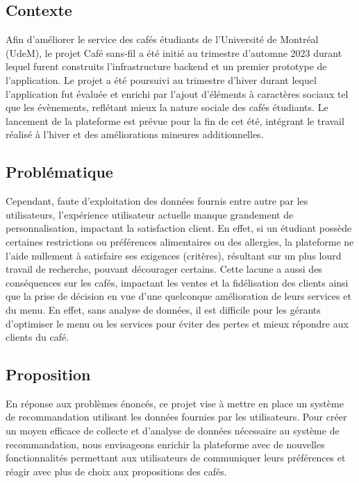 \documentclass[11pt]{article}
\begin{document}
\subsection{Contexte}
Afin d'améliorer le service des cafés étudiants de l'Université de Montréal (UdeM), le projet Café sans-fil a été initié au trimestre d'automne 2023 durant lequel furent construits l'infrastructure backend et un premier prototype de l'application. Le projet a été poursuivi au trimestre d'hiver durant lequel l'application fut évaluée et enrichi par l'ajout d'éléments à caractères sociaux tel que les évènements, reflétant mieux la nature sociale des cafés étudiants. Le lancement de la plateforme est prévue pour la fin de cet été, intégrant le travail réalisé à l'hiver et des améliorations mineures additionnelles.\\

\subsection{Problématique}
Cependant, faute d'exploitation des données fournis entre autre par les utilisateurs, l'expérience utilisateur actuelle manque grandement de personnalisation, impactant la satisfaction client. En effet, si un étudiant possède certaines restrictions ou préférences alimentaires ou des allergies, la plateforme ne l'aide nullement à satisfaire ses exigences (critères), résultant sur un plus lourd travail de recherche, pouvant décourager certains.
Cette lacune a aussi des conséquences sur les cafés, impactant les ventes et la fidélisation des clients ainsi que la prise de décision en vue d'une quelconque amélioration de leurs services et du menu. En effet, sans analyse de données, il est difficile pour les gérants d'optimiser le menu ou les services pour éviter des pertes et mieux répondre aux clients du café.\\

\subsection{Proposition}
En réponse aux problèmes énoncés, ce projet vise à mettre en place un système de recommandation utilisant les données fournies par les utilisateurs. Pour créer un moyen efficace de collecte et d'analyse de données nécessaire au système de recommandation, nous envisageons enrichir la plateforme avec de nouvelles fonctionnalités permettant aux utilisateurs de communiquer leurs préférences et réagir avec plus de choix aux propositions des cafés.
\end{document}
